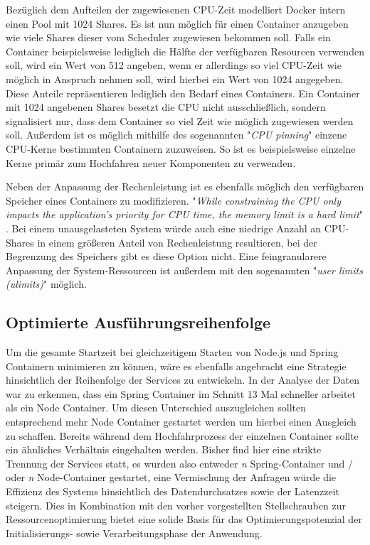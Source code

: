 Bezüglich dem Aufteilen der zugewiesenen CPU-Zeit modelliert Docker intern einen Pool mit 1024 Shares. Es ist nun möglich für einen Container anzugeben wie viele Shares dieser vom Scheduler zugewiesen bekommen soll. Falls ein Container beispielsweise lediglich die Hälfte der verfügbaren Resourcen verwenden soll, wird ein Wert von 512 angeben, wenn er allerdings so viel CPU-Zeit wie möglich in Anspruch nehmen soll, wird hierbei ein Wert von 1024 angegeben. Diese Anteile repräsentieren lediglich den Bedarf eines Containers. Ein Container mit 1024 angebenen Shares besetzt die CPU nicht ausschließlich, sondern signalisiert nur, dass dem Container so viel Zeit wie möglich zugewiesen werden soll. Außerdem ist es möglich mithilfe des sogenannten "\emph{CPU pinning}" einzene CPU-Kerne bestimmten Containern zuzuweisen. So ist es beispielsweise einzelne Kerne primär zum Hochfahren neuer Komponenten zu verwenden. 

Neben der Anpassung der Rechenleistung ist es ebenfalls möglich den verfügbaren Speicher eines Containers zu modifizieren. "\emph{While constraining the CPU only impacts the application’s priority for CPU time, the memory limit is a hard limit}" \cite[Seite~68 ff.]{oreilly-docker}. Bei einem unausgelasteten System würde auch eine niedrige Anzahl an CPU-Shares in einem größeren Anteil von Rechenleistung resultieren, bei der Begrenzung des Speichers gibt es diese Option nicht. Eine feingranularere Anpassung der System-Ressourcen ist außerdem mit den sogenannten "\emph{user limits (ulimits)}" möglich.


\subsection{Optimierte Ausführungsreihenfolge}
Um die gesamte Startzeit bei gleichzeitigem Starten von Node.js und Spring Containern minimieren zu können, wäre es ebenfalls angebracht eine Strategie hinsichtlich der Reihenfolge der Services zu entwickeln. In der Analyse der Daten war zu erkennen, dass ein Spring Container im Schnitt 13 Mal schneller arbeitet als ein Node Container. Um diesen Unterschied auszugleichen sollten entsprechend mehr Node Container gestartet werden um hierbei einen Ausgleich zu schaffen. Bereits während dem Hochfahrprozess der einzelnen Container sollte ein ähnliches Verhältnis eingehalten werden. Bisher find hier eine strikte Trennung der Services statt, es wurden also entweder \emph{n} Spring-Container und / oder \emph{n} Node-Container gestartet, eine Vermischung der Anfragen würde die Effizienz des Systems hinsichtlich des Datendurchsatzes sowie der Latenzzeit steigern. Dies in Kombination mit den vorher vorgestellten Stellschrauben zur Ressourcenoptimierung bietet eine solide Basis für das Optimierungspotenzial der Initialisierungs- sowie Verarbeitungsphase der Anwendung.


